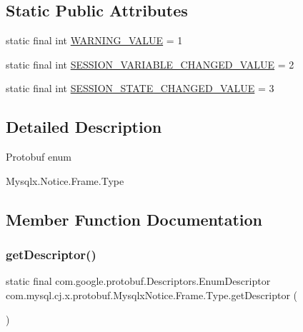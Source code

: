 \subsection*{Static Public Attributes}
\begin{DoxyCompactItemize}
\item 
static final int \mbox{\hyperlink{enumcom_1_1mysql_1_1cj_1_1x_1_1protobuf_1_1_mysqlx_notice_1_1_frame_1_1_type_af47cb77be84f8218ed6fda8113c697dc}{W\+A\+R\+N\+I\+N\+G\+\_\+\+V\+A\+L\+UE}} = 1
\item 
static final int \mbox{\hyperlink{enumcom_1_1mysql_1_1cj_1_1x_1_1protobuf_1_1_mysqlx_notice_1_1_frame_1_1_type_afa6a2e75f31b141be51060eddeccaea1}{S\+E\+S\+S\+I\+O\+N\+\_\+\+V\+A\+R\+I\+A\+B\+L\+E\+\_\+\+C\+H\+A\+N\+G\+E\+D\+\_\+\+V\+A\+L\+UE}} = 2
\item 
static final int \mbox{\hyperlink{enumcom_1_1mysql_1_1cj_1_1x_1_1protobuf_1_1_mysqlx_notice_1_1_frame_1_1_type_a3708b28b79956ca46e808de7b4c978a8}{S\+E\+S\+S\+I\+O\+N\+\_\+\+S\+T\+A\+T\+E\+\_\+\+C\+H\+A\+N\+G\+E\+D\+\_\+\+V\+A\+L\+UE}} = 3
\end{DoxyCompactItemize}


\subsection{Detailed Description}
Protobuf enum
\begin{DoxyCode}
Mysqlx.Notice.Frame.Type 
\end{DoxyCode}
 

\subsection{Member Function Documentation}
\mbox{\label{enumcom_1_1mysql_1_1cj_1_1x_1_1protobuf_1_1_mysqlx_notice_1_1_frame_1_1_type_af9bb1206ab928bd5b84b552c8ba73dd2}} 
\subsubsection{\texorpdfstring{get\+Descriptor()}{getDescriptor()}}
{\footnotesize\ttfamily static final com.\+google.\+protobuf.\+Descriptors.\+Enum\+Descriptor com.\+mysql.\+cj.\+x.\+protobuf.\+Mysqlx\+Notice.\+Frame.\+Type.\+get\+Descriptor (\begin{DoxyParamCaption}{ }\end{DoxyParamCaption})\hspace{0.3cm}{\ttfamily [static]}}

